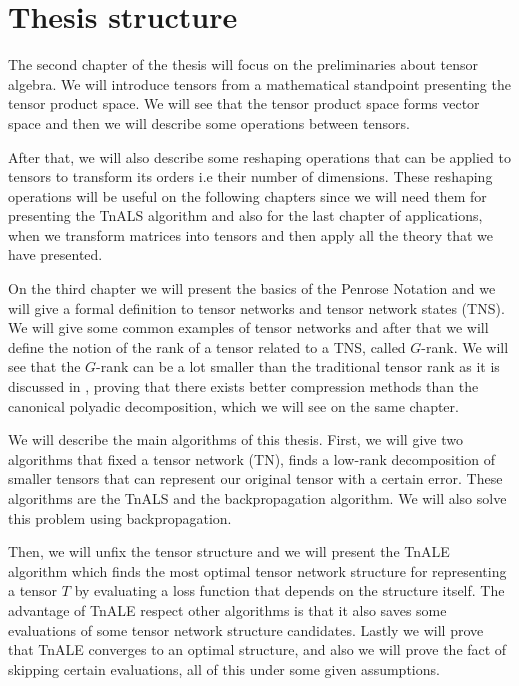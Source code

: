 \documentclass[11pt,a4paper,openright,oneside]{book}
\numberwithin{equation}{section}
\begin{document}
\section{Thesis structure}


The second chapter of the thesis will focus on the preliminaries about tensor algebra. We will introduce 
tensors from a mathematical standpoint presenting the tensor product space.
We will see that the tensor product space forms vector space and then we will describe
some operations between tensors.

After that, we will also describe some reshaping operations that can be applied to tensors to transform its
orders i.e their number of dimensions. These reshaping operations will be useful on the following chapters
since we will need them for presenting the \gls{TnALS} algorithm and also for the last chapter of applications, when
we transform matrices into tensors and then apply all the theory that we have presented.

On the third chapter we will present the basics of the Penrose Notation and we will give a formal
definition to tensor networks and tensor network states (\gls{TNS}). We will give some
common examples of tensor networks and after that we will define the notion
of the rank of a tensor related to a TNS, called $G$-rank. We will see that the $G$-rank can be a lot smaller
than the traditional tensor rank as it is discussed in \cite{yeTensorNetworkRanks2019},
proving that there exists better compression methods than the canonical
polyadic decomposition, which we will see on the same chapter.

We will describe the main algorithms of this thesis. First, we will give two algorithms
that fixed a tensor network (\gls{TN}), finds a low-rank decomposition of smaller tensors that can represent our original tensor
with a certain error. These algorithms are the \gls{TnALS} and the backpropagation algorithm.
We will also solve this problem using backpropagation.

Then, we will unfix the tensor structure and we will present the \gls{TnALE} algorithm which finds the most optimal
tensor network structure for representing a tensor $T$ by evaluating a loss function that depends on the
structure itself. The advantage of TnALE respect other algorithms
is that it also saves some evaluations of some tensor network structure candidates. Lastly we will prove
that \gls{TnALE} converges to an optimal structure, and also we will prove the fact of
skipping certain evaluations, all of this under some given assumptions.
\end{document}
